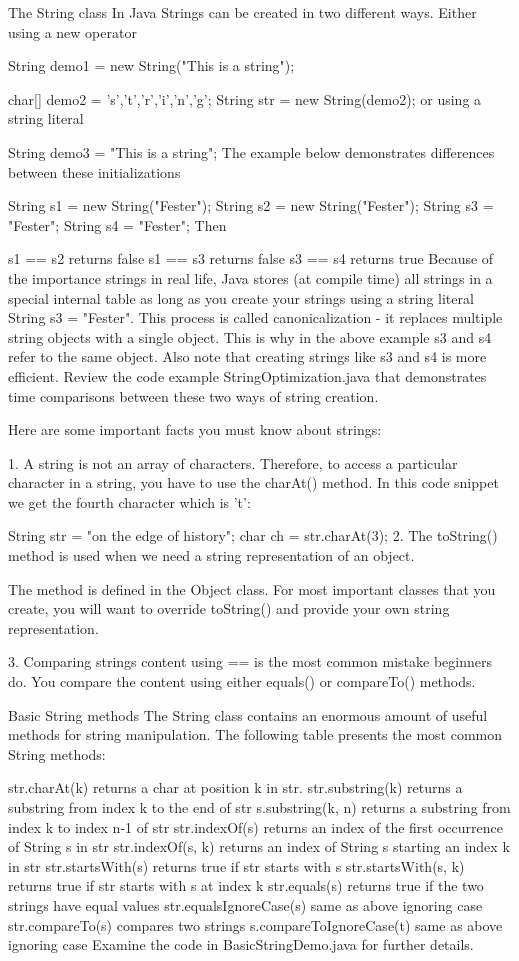 The String class
In Java Strings can be created in two different ways. Either using a new operator

String demo1 = new String("This is a string");

char[] demo2 = {'s','t','r','i','n','g'};
String str = new String(demo2);
or using a string literal

String demo3 = "This is a string";
The example below demonstrates differences between these initializations

String s1 = new String("Fester");
String s2 = new String("Fester");
String s3 = "Fester";
String s4 = "Fester";
Then

s1 == s2 returns false
s1 == s3 returns false
s3 == s4 returns true
Because of the importance strings in real life, Java stores (at compile time) all strings in a special internal table as long as you create your strings using a string literal String s3 = "Fester". This process is called canonicalization - it replaces multiple string objects with a single object. This is why in the above example s3 and s4 refer to the same object. Also note that creating strings like s3 and s4 is more efficient. Review the code example StringOptimization.java that demonstrates time comparisons between these two ways of string creation.

Here are some important facts you must know about strings:

1. A string is not an array of characters. Therefore, to access a particular character in a string, you have to use the charAt() method. In this code snippet we get the fourth character which is 't':

String str = "on the  edge of history";
char ch = str.charAt(3);
2. The toString() method is used when we need a string representation of an object.

The method is defined in the Object class. For most important classes that you create, you will want to override toString() and provide your own string representation.

3. Comparing strings content using == is the most common mistake beginners do. You compare the content using either equals() or compareTo() methods.

Basic String methods
The String class contains an enormous amount of useful methods for string manipulation. The following table presents the most common String methods:

str.charAt(k) returns a char at position k in str.
str.substring(k) returns a substring from index k to the end of str
s.substring(k, n) returns a substring from index k to index n-1 of str
str.indexOf(s) returns an index of the first occurrence of String s in str
str.indexOf(s, k) returns an index of String s starting an index k in str
str.startsWith(s) returns true if str starts with s
str.startsWith(s, k) returns true if str starts with s at index k
str.equals(s) returns true if the two strings have equal values
str.equalsIgnoreCase(s) same as above ignoring case
str.compareTo(s) compares two strings
s.compareToIgnoreCase(t) same as above ignoring case
Examine the code in BasicStringDemo.java for further details.

